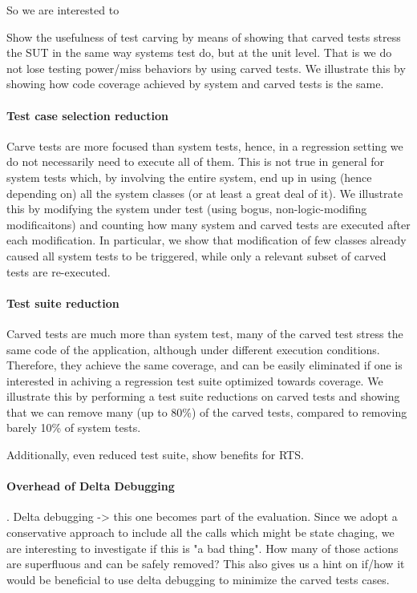 \documentclass[10pt,conference]{IEEEtran}
\begin{document}

So we are interested to 


Show the usefulness of test carving by means of showing that 
carved tests stress the SUT in the same way systems test do, but at the unit level. 
That is we do not lose testing power/miss behaviors by using carved tests.
%
We illustrate this by showing how code coverage achieved by system and carved tests is the same.

\paragraph{Test case selection reduction}
Carve tests are more focused than system tests, hence, in a regression setting we do not necessarily need 
to execute all of them. This is not true in general for system tests which, by involving the entire system, end up in using (hence depending on)
all the system classes (or at least a great deal of it).
%
We illustrate this by modifying the system under test (using bogus, non-logic-modifing modificaitons) and counting how many system and carved
tests are executed after each modification. In particular, we show that modification of few classes already caused all system tests to be triggered,
while only a relevant subset of carved tests are re-executed.

\paragraph{Test suite reduction}
Carved tests are much more than system test, many of the carved test stress the same code of the application, although under different execution conditions. Therefore, they achieve the same coverage, and can be easily eliminated if one is interested in achiving a regression test suite optimized towards coverage.
%
We illustrate this by performing a test suite reductions on carved tests and showing that we can remove many (up to 80\%) of the carved tests, compared to removing barely 10\% of system tests.

Additionally, even reduced test suite, show benefits for RTS.

\paragraph{Overhead of Delta Debugging}.
Delta debugging -> this one becomes part of the evaluation. Since we adopt a conservative approach to include all the calls which might be state chaging,
we are interesting to investigate if this is "a bad thing". How many of those actions are superfluous and can be safely removed?
This also gives us a hint on if/how it would be beneficial to use delta debugging to minimize the carved tests cases.
\end{document}
